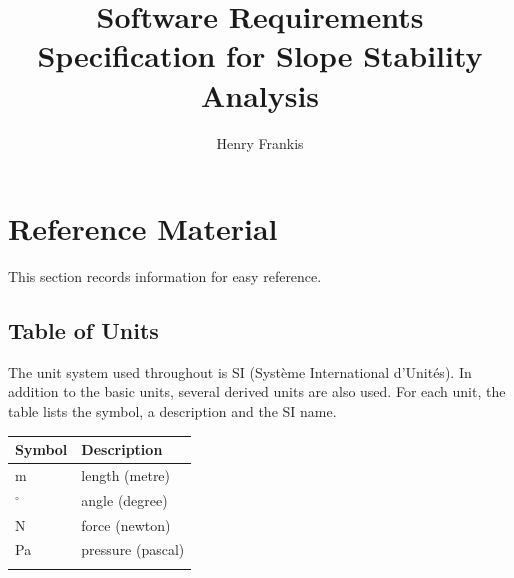 \documentclass[12pt]{article}
\title{Software Requirements Specification for Slope Stability Analysis}
\author{Henry Frankis}
\begin{document}
\maketitle
\tableofcontents
\newpage
\section{Reference Material}
\label{Sec:RM}
This section records information for easy reference.
\subsection{Table of Units}
\label{Sec:ToU}
The unit system used throughout is SI (Syst\`{e}me International d'Unit\'{e}s). In addition to the basic units, several derived units are also used. For each unit, the table lists the symbol, a description and the SI name.
\begin{longtable*}{l l}
\toprule
Symbol & Description
\\
\midrule
m & length (metre)
\\
${}^{\circ}$ & angle (degree)
\\
N & force (newton)
\\
Pa & pressure (pascal)
\\
\bottomrule
\label{Table:ToU}
\end{longtable*}
\end{document}
